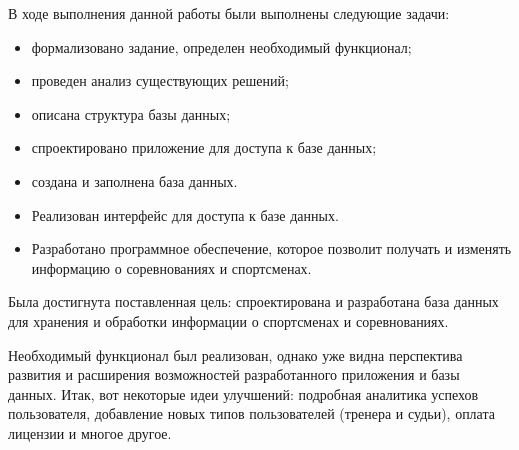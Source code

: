 
В ходе выполнения данной работы были выполнены следующие задачи:

\begin{itemize}
	\item формализовано задание, определен необходимый функционал;
	\item проведен анализ существующих решений;
	\item описана структура базы данных;
	\item спроектировано приложение для доступа к базе данных;
	\item создана и заполнена база данных.
	\item Реализован интерфейс для доступа к базе данных.
	\item Разработано программное обеспечение, которое позволит получать и изменять информацию о соревнованиях и спортсменах.
\end{itemize}

Была достигнута поставленная цель: спроектирована и разработана база данных для хранения и обработки информации о спортсменах и соревнованиях.

Необходимый функционал был реализован, однако уже видна перспектива развития и расширения возможностей разработанного приложения и базы данных. Итак, вот некоторые идеи улучшений: подробная аналитика успехов пользователя, добавление новых типов пользователей (тренера и судьи), оплата лицензии и многое другое.